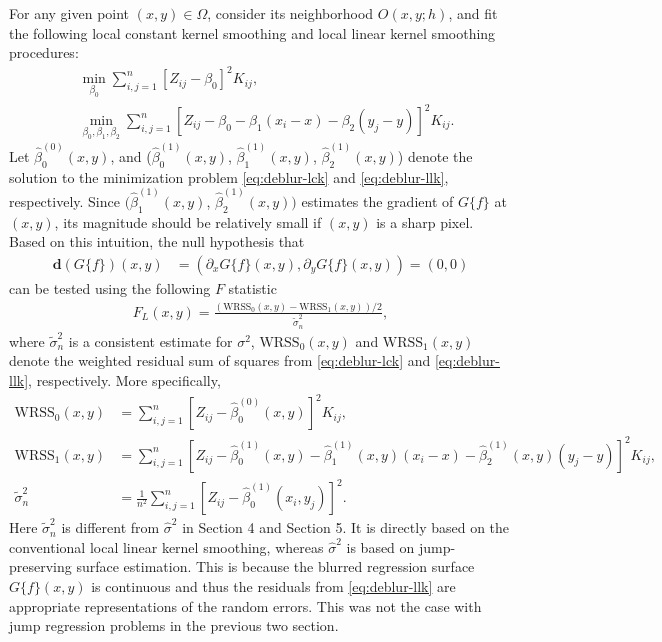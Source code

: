 For any given point \((x,y) \in \Omega\), consider its neighborhood \(O(x, y; h)\), and fit the following local constant kernel smoothing and local linear kernel smoothing procedures:
\begin{align}
  & \min_{\beta_0} \sum_{i,j=1}^n \left[ Z_{ij} - \beta_0 \right]^2 K_{ij}, \label{eq:deblur-lck} \\
  & \min_{\beta_0, \beta_1, \beta_2} \sum_{i,j=1}^n \left[ Z_{ij} - \beta_0 -\beta_1(x_i-x) - \beta_2(y_j-y)  \right]^2 K_{ij} \label{eq:deblur-llk}. 
\end{align}
Let \(\widehat{\beta}^{(0)}_0(x,y)\), and (\(\widehat{\beta}^{(1)}_0(x,y)\), \(\widehat{\beta}^{(1)}_1(x,y)\), \(\widehat{\beta}^{(1)}_2(x,y)\)) denote the solution to the minimization problem \eqref{eq:deblur-lck} and \eqref{eq:deblur-llk}, respectively. Since \((\widehat{\beta}^{(1)}_1(x,y)\), \(\widehat{\beta}^{(1)}_2(x,y))\) estimates the gradient of \(G\{f\}\) at \((x,y)\), its magnitude should be relatively small if \((x, y)\) is a sharp pixel. Based on this intuition, the null hypothesis that
\begin{align}
  \label{eq:H0}
  \mathbf{d}\left(G\{f\}\right)(x,y) &= (\partial_x G\{f\}(x,y), \partial_y G\{f\} (x,y))=(0,0)
\end{align}
can be tested using the following \(F\) statistic
\begin{align*}
  F_L(x,y) = \frac{\left(\text{WRSS}_0(x,y) - \text{WRSS}_1(x,y)\right)/2}{\widetilde{\sigma}_n^2},
\end{align*}
where \(\widetilde{\sigma}_n^2\) is a consistent estimate for \(\sigma^2\), \(\text{WRSS}_0(x,y)\) and \(\text{WRSS}_1(x,y)\) denote the weighted residual sum of squares from \eqref{eq:deblur-lck} and \eqref{eq:deblur-llk}, respectively. More specifically,
\begin{align*}
  \text{WRSS}_0(x,y) & = \sum_{i,j=1}^n \left[ Z_{ij} - \widehat{\beta}^{(0)}_0(x,y) \right]^2 K_{ij}, \\
  \text{WRSS}_1(x,y) & = \sum_{i,j=1}^n \left[ Z_{ij} - \widehat{\beta}^{(1)}_0(x,y) -  \widehat{\beta}^{(1)}_1(x,y) (x_i-x) -  \widehat{\beta}^{(1)}_2(x,y) (y_j-y)  \right]^2 K_{ij}, \\
  \widetilde{\sigma}_n^2 &= \frac{1}{n^2} \sum_{i,j=1}^n \left[ Z_{ij} - \widehat{\beta}_0^{(1)}(x_i, y_j) \right]^2.
\end{align*}
Here \(\widetilde{\sigma}^2_n\) is different from \(\widehat{\sigma}^2\) in Section 4 and Section 5. It is directly based on the conventional local linear kernel smoothing, whereas \(\widehat{\sigma}^2\) is based on jump-preserving surface estimation. This is because the blurred regression surface \(G\{f\}(x, y)\) is continuous and thus the residuals from \eqref{eq:deblur-llk} are appropriate representations of the random errors. This was not the case with jump regression problems in the previous two section.

